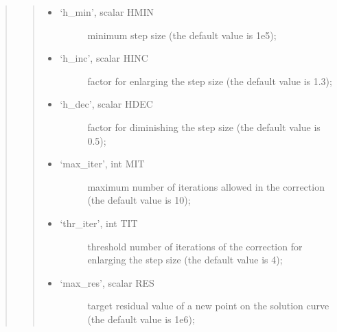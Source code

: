 \documentclass[a4paper,11pt,english]{sphinxmanual}
\begin{document}
\begin{quote}
\begin{quote}
\begin{itemize}
\begin{description}
\end{description}

\item {} \begin{description}
\item[{‘h\_min’, scalar HMIN}] \leavevmode
\sphinxAtStartPar
minimum step size (the default value is 1e\sphinxhyphen{}5);

\end{description}

\item {} \begin{description}
\item[{‘h\_inc’, scalar HINC}] \leavevmode
\sphinxAtStartPar
factor for enlarging the step size (the default value is 1.3);

\end{description}

\item {} \begin{description}
\item[{‘h\_dec’, scalar HDEC}] \leavevmode
\sphinxAtStartPar
factor for diminishing the step size (the default value is 0.5);

\end{description}

\item {} \begin{description}
\item[{‘max\_iter’, int MIT}] \leavevmode
\sphinxAtStartPar
maximum number of iterations allowed in the correction (the default
value is 10);

\end{description}

\item {} \begin{description}
\item[{‘thr\_iter’, int TIT}] \leavevmode
\sphinxAtStartPar
threshold number of iterations of the correction for enlarging the
step size (the default value is 4);

\end{description}

\item {} \begin{description}
\item[{‘max\_res’, scalar RES}] \leavevmode
\sphinxAtStartPar
target residual value of a new point on the solution curve (the
default value is 1e\sphinxhyphen{}6);

\end{description}


\end{itemize}
\end{quote}
\end{quote}
\end{document}
